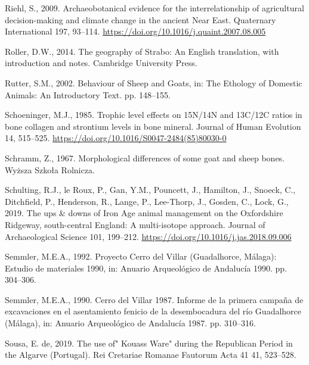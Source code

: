 \documentclass[preprint, 3p, authoryear]{elsarticle} %
\newlength{\cslhangindent}
\newlength{\cslentryspacingunit} %
\newenvironment{CSLReferences}[2] %
 {%
  \setlength{\parindent}{0pt}
  \ifodd #1
  \let\oldpar\par
  \def\par{\hangindent=\cslhangindent\oldpar}
  \fi
  \setlength{\parskip}{#2\cslentryspacingunit}
 }%
 {}
\begin{document}
\begin{CSLReferences}{1}{0}
\leavevmode{}%
Riehl, S., 2009. Archaeobotanical evidence for the interrelationship of agricultural decision-making and climate change in the ancient {Near East}. Quaternary International 197, 93--114. \url{https://doi.org/10.1016/j.quaint.2007.08.005}

\leavevmode{}%
Roller, D.W., 2014. The geography of {Strabo}: {An English} translation, with introduction and notes. {Cambridge University Press}.

\leavevmode{}%
Rutter, S.M., 2002. Behaviour of {Sheep} and {Goats}, in: The Ethology of Domestic Animals: {An} Introductory Text. pp. 148--155.

\leavevmode{}%
Schoeninger, M.J., 1985. Trophic level effects on {15N}/{14N} and {13C}/{12C} ratios in bone collagen and strontium levels in bone mineral. Journal of Human Evolution 14, 515--525. \url{https://doi.org/10.1016/S0047-2484(85)80030-0}

\leavevmode{}%
Schramm, Z., 1967. Morphological differences of some goat and sheep bones. {Wyższa Szkoła Rolnicza}.

\leavevmode{}%
Schulting, R.J., le Roux, P., Gan, Y.M., Pouncett, J., Hamilton, J., Snoeck, C., Ditchfield, P., Henderson, R., Lange, P., Lee-Thorp, J., Gosden, C., Lock, G., 2019. The ups \& downs of {Iron Age} animal management on the {Oxfordshire Ridgeway}, south-central {England}: A multi-isotope approach. Journal of Archaeological Science 101, 199--212. \url{https://doi.org/10.1016/j.jas.2018.09.006}

\leavevmode{}%
Semmler, M.E.A., 1992. Proyecto {Cerro} del {Villar} ({Guadalhorce}, {Málaga}): Estudio de materiales 1990, in: Anuario Arqueológico de {Andalucía} 1990. pp. 304--306.

\leavevmode{}%
Semmler, M.E.A., 1990. Cerro del {Villar} 1987. {Informe} de la primera campaña de excavaciones en el asentamiento fenicio de la desembocadura del río {Guadalhorce} ({Málaga}), in: Anuario Arqueológico de {Andalucía} 1987. pp. 310--316.

\leavevmode{}%
Sousa, E. de, 2019. The use of" {Kouass Ware}" during the {Republican Period} in the {Algarve} ({Portugal}). Rei Cretariae Romanae Fautorum Acta 41 41, 523--528.


\end{CSLReferences}
\end{document}
